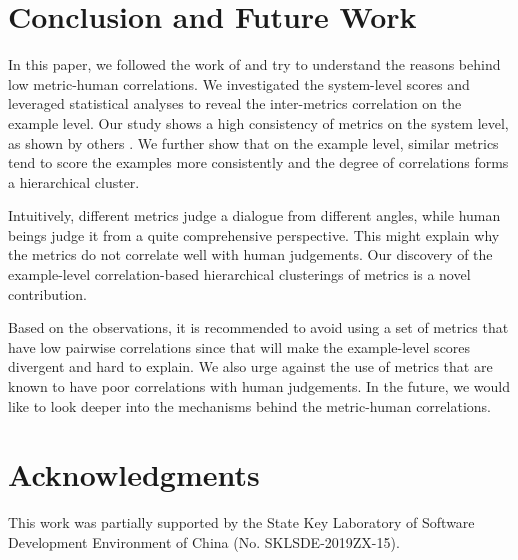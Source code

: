 \documentclass[conference]{IEEEtran}
\begin{document}
\section{Conclusion and Future Work}
    In this paper, we followed the work of \cite{HowNot} and try to understand the reasons behind low metric-human correlations. We investigated the system-level scores and leveraged statistical analyses to reveal the inter-metrics correlation on the example level. Our study shows a high consistency of metrics on the system level, as shown by others \cite{HowNot,VHRED,GoogleChatbot}. We further show that on the example level, similar metrics tend to score the examples more consistently and the degree of correlations forms a hierarchical cluster.

    Intuitively, different metrics judge a dialogue from different angles, while human beings judge it from a quite comprehensive perspective. This might explain why the metrics do not correlate well with human judgements. Our discovery of the example-level correlation-based hierarchical clusterings of metrics is a novel contribution.

    Based on the observations, it is recommended to avoid using a set of metrics that have low pairwise correlations since that will make the example-level scores divergent and hard to explain. We also urge against the use of metrics that are known to have poor correlations with human judgements. In the future, we would like to look deeper into the mechanisms behind the metric-human correlations.

\section*{Acknowledgments}
This work was partially supported by the State Key Laboratory of Software Development Environment of China (No. SKLSDE-2019ZX-15).



%
%
%
\balance




\end{document}
